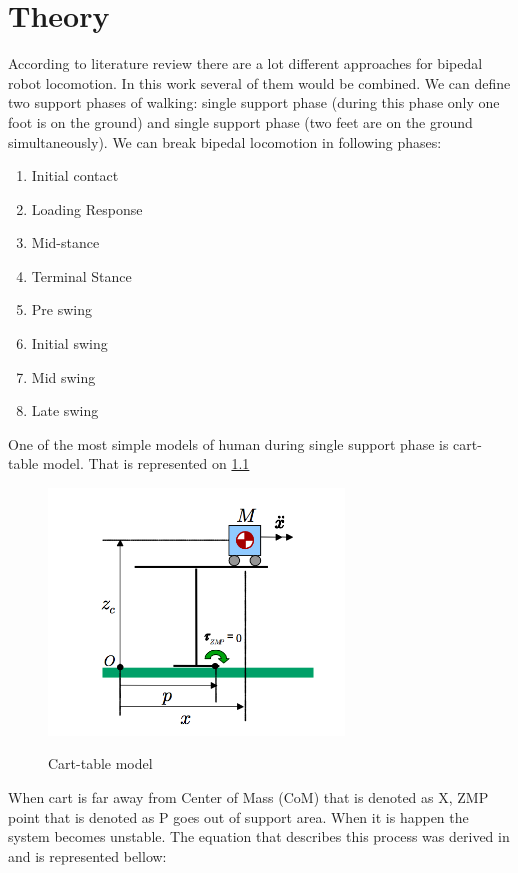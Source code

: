 \documentclass[12pt,a4paper]{report}
\begin{document}
		
	\chapter{Theory}
		According to literature review there are a lot different approaches for bipedal robot locomotion. In this work several of them would be combined.
		We can define two support phases of walking: single support phase (during this phase only one foot is on the ground) and single support phase (two feet are on the ground simultaneously).
		We can break bipedal locomotion in following phases:
		
		\begin{enumerate}
			\item Initial contact
			\item Loading Response
			\item Mid-stance
			\item Terminal Stance
			\item Pre swing
			\item Initial swing
			\item Mid swing
			\item Late swing			
		\end{enumerate}
		
		One of the most simple models of human during single support phase is cart-table model. That is represented on \cref{fig:6}
		
		\begin{figure}[h!]
			\vspace{-0.2cm}
			\centering
			{\includegraphics[width=0.7\textwidth]{6}}
			\caption{Cart-table model \cite{kajita2003biped}}
			\label{fig:6}
			\vspace{-0.1cm}
		\end{figure}
		
		When cart is far away from Center of Mass (CoM) that is denoted as X, ZMP point that is denoted as P goes out of support area. When it is happen the system becomes unstable.
		The equation that describes this process was derived in \cite{kajita2003biped} and is represented bellow:
		
\end{document}
